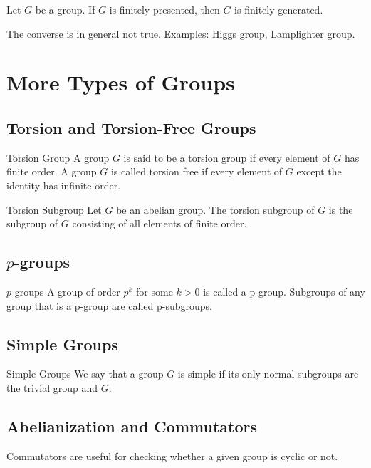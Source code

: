 \documentclass[a4paper]{article}
\begin{document}
\begin{prp}{}{} Let $G$ be a group. If $G$ is finitely presented, then $G$ is finitely generated. 
\end{prp}

The converse is in general not true. Examples: Higgs group, Lamplighter group. 

\pagebreak
\section{More Types of Groups}
\subsection{Torsion and Torsion-Free Groups}
\begin{defn}{Torsion Group}{} A group $G$ is said to be a torsion group if every element of $G$ has finite order. A group $G$ is called torsion free if every element of $G$ except the identity has infinite order. 
\end{defn}

\begin{defn}{Torsion Subgroup}{} Let $G$ be an abelian group. The torsion subgroup of $G$ is the subgroup of $G$ consisting of all elements of finite order. 
\end{defn}

\subsection{$p$-groups}
\begin{defn}{$p$-groups}{} A group of order $p^k$ for some $k>0$ is called a p-group. Subgroups of any group that is a p-group are called p-subgroups. 
\end{defn}

\subsection{Simple Groups}
\begin{defn}{Simple Groups}{} We say that a group $G$ is simple if its only normal subgroups are the trivial group and $G$. 
\end{defn}

\subsection{Abelianization and Commutators}
Commutators are useful for checking whether a given group is cyclic or not. 
\end{document}
